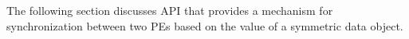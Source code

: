 The following section discusses \openshmem \ac{API} that provides a mechanism for synchronization between two \ac{PE}s based on the value of a symmetric data object. 